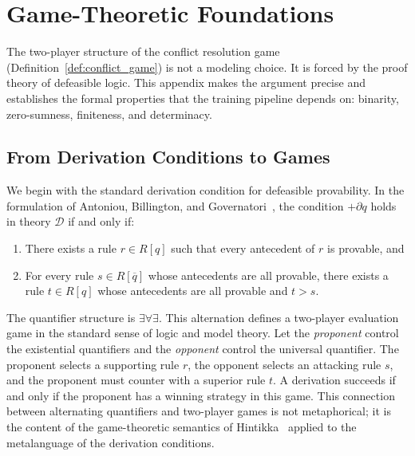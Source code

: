 \documentclass{article}
\theoremstyle{definition}
\newcommand{\D}{\mathcal{D}}
\newcommand{\comp}[1]{\overline{#1}}
\begin{document}

\section{Game-Theoretic Foundations}\label{app:game_theory}

The two-player structure of the conflict resolution game (Definition~\ref{def:conflict_game}) is not a modeling choice. It is forced by the proof theory of defeasible logic. This appendix makes the argument precise and establishes the formal properties that the training pipeline depends on: binarity, zero-sumness, finiteness, and determinacy.

\subsection{From Derivation Conditions to Games}

We begin with the standard derivation condition for defeasible provability. In the formulation of Antoniou, Billington, and Governatori~\cite{antoniou2001defeasible}, the condition $+\partial q$ holds in theory $\D$ if and only if:

\begin{enumerate}[nosep]
    \item There exists a rule $r \in R[q]$ such that every antecedent of $r$ is provable, and
    \item For every rule $s \in R[\comp{q}]$ whose antecedents are all provable, there exists a rule $t \in R[q]$ whose antecedents are all provable and $t > s$.
\end{enumerate}

The quantifier structure is $\exists \forall \exists$. This alternation defines a two-player evaluation game in the standard sense of logic and model theory. Let the \emph{proponent} control the existential quantifiers and the \emph{opponent} control the universal quantifier. The proponent selects a supporting rule $r$, the opponent selects an attacking rule $s$, and the proponent must counter with a superior rule $t$. A derivation succeeds if and only if the proponent has a winning strategy in this game. This connection between alternating quantifiers and two-player games is not metaphorical; it is the content of the game-theoretic semantics of Hintikka~\cite{hintikka1996principles} applied to the metalanguage of the derivation conditions.
\end{document}
